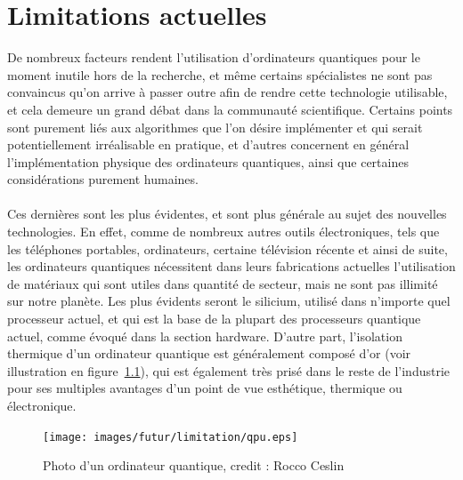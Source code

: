 \chapter{Limitations actuelles}\label{ch:limitations-actuelles}

De nombreux facteurs rendent l'utilisation d'ordinateurs quantiques pour le moment inutile
hors de la recherche, et même certains spécialistes ne sont pas convaincus qu'on arrive à
passer outre afin de rendre cette technologie utilisable, et cela demeure un grand débat
dans la communauté scientifique.
Certains points sont purement liés aux algorithmes que l'on désire implémenter et qui serait
potentiellement irréalisable en pratique, et d'autres concernent en général l'implémentation
physique des ordinateurs quantiques, ainsi que certaines considérations purement humaines.\\ \\
Ces dernières sont les plus évidentes, et sont plus générale au sujet des nouvelles technologies.
En effet, comme de nombreux autres outils électroniques, tels que les téléphones portables,
ordinateurs, certaine télévision récente et ainsi de suite, les ordinateurs quantiques
nécessitent dans leurs fabrications actuelles l'utilisation de matériaux qui sont utiles dans
quantité de secteur, mais ne sont pas illimité sur notre planète.
Les plus évidents seront le silicium, utilisé dans n'importe quel processeur actuel, et
qui est la base de la plupart des processeurs quantique actuel, comme évoqué dans la section
hardware.
D'autre part, l'isolation thermique d'un ordinateur quantique est généralement composé d'or
(voir illustration en figure~\ref{fig:photo-qc}), qui est également très prisé dans le reste
de l'industrie pour ses multiples avantages d'un point de vue esthétique, thermique ou électronique.

\begin{figure}[H]
\centering
\texttt{[image: images/futur/limitation/qpu.eps]}
\caption{Photo d'un ordinateur quantique, credit : Rocco Ceslin}
\label{fig:photo-qc}
\end{figure}

